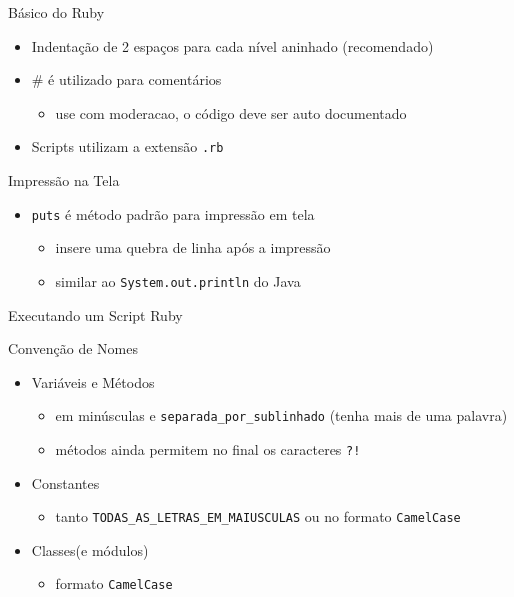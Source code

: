 \begin{frame}[fragile,t]{Básico do Ruby}
  \begin{itemize}
    \item Indentação de 2 espaços para cada nível aninhado (recomendado)
    \item \# é utilizado para comentários
    \begin{itemize}
    	\item use com moderacao, o código deve ser auto documentado
    \end{itemize}
    \item Scripts utilizam a extensão \verb!.rb!
    
	
  \end{itemize}   
\end{frame}

\begin{frame}[fragile,t]{Impressão na Tela}
  \begin{itemize}
    \item \verb!puts! é método padrão para impressão em tela 
    \begin{itemize}
    	\item insere uma quebra de linha após a impressão
    	\item similar ao \verb!System.out.println! do Java
    \end{itemize}
  \end{itemize}   
\end{frame}

\begin{frame}[fragile,t]{Executando um Script Ruby}
\end{frame}

\begin{frame}[fragile,t]{Convenção de Nomes}
  \begin{itemize}
    \item Variáveis e Métodos
    \begin{itemize}
    	\item em minúsculas e \verb!separada_por_sublinhado! (tenha mais de uma palavra)
    	\item métodos ainda permitem no final os caracteres \verb|?!|
    \end{itemize}
    \item Constantes
    \begin{itemize}
    	\item tanto \verb!TODAS_AS_LETRAS_EM_MAIUSCULAS! ou no formato \verb!CamelCase!
    \end{itemize}
    \item Classes(e módulos)
    \begin{itemize}
    	\item formato \verb!CamelCase! 
    \end{itemize}
  \end{itemize}
\end{frame}


